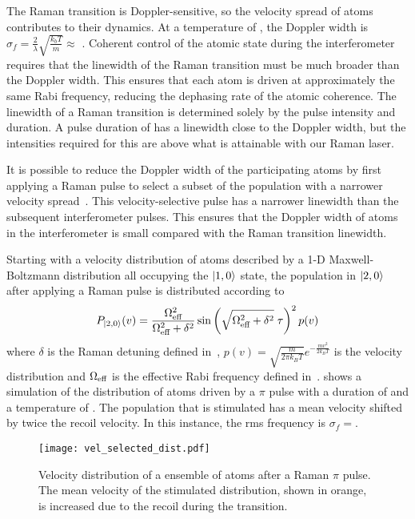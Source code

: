 The Raman transition is Doppler-sensitive, so the velocity spread of atoms 
contributes to their dynamics. At a temperature of , the Doppler
width is \(\sigma_f = \frac{2}{\lambda}\sqrt{\frac{k_b T}{m}}
\approx\) . Coherent control of the atomic
state during the interferometer requires that the linewidth of the Raman
transition must be much broader than the Doppler width. This ensures
that each atom is driven at approximately the same Rabi frequency,
reducing the dephasing rate of the atomic coherence. The linewidth of
a Raman transition is determined solely by the pulse intensity and
duration. A pulse duration of  has a
linewidth close
to the Doppler width, but the intensities required for this are above
what is attainable with our Raman laser. 
\par\noindent
It is possible to reduce the Doppler width of the participating atoms
by first applying a Raman pulse to select a subset of the population
with a narrower velocity spread~\cite{Moler1992}. This
velocity-selective pulse has a narrower linewidth than the subsequent
interferometer pulses. This ensures that the
Doppler width of atoms in the interferometer is small compared with
the Raman transition linewidth. 
\par\noindent 
Starting with a velocity distribution of atoms
described by a 1-D Maxwell-Boltzmann distribution all occupying the
\(\ket{1,0}\) state, the
population in \(\ket{2,0}\) after applying a Raman pulse is
distributed according to
\begin{equation}
  P_{\ket{2,0}}(v) = \frac{\Omega_\textnormal{eff}^2}{\Omega_\textnormal{eff}^2 + \delta^2}
  \sin\left(\sqrt{\Omega_\textnormal{eff}^2+\delta^2}\;\tau\right)^2 p(v)
  \label{eq:vel_selected_dist}
\end{equation}
where \(\delta\) is the Raman detuning defined
in~, \(p(v) = \sqrt{\frac{m}{2\pi
k_B T}} e^{-\frac{m v^2}{2 k_B T}}\) is the velocity distribution and
\(\Omega_\textnormal{eff}\) is the effective Rabi frequency defined
in~. 
shows a simulation of the
distribution of atoms driven by a $\pi$ pulse with a duration of
 and a temperature of
.
The population that is stimulated
has a mean velocity shifted by twice the recoil velocity. In this
instance, the rms
frequency is \(\sigma_f
=\).
\begin{figure}[htpb!]
  \centering
  \texttt{[image: vel\_selected\_dist.pdf]}
  \caption[Simulated velocity distribution after a Raman $\pi$ pulse.]{Velocity distribution of a 
  ensemble of atoms after a  Raman \(\pi\)
pulse. The mean velocity of the stimulated distribution, shown in
orange, is increased due to the recoil during the transition.}
  \label{fig:vel_selected_dist}
\end{figure}
